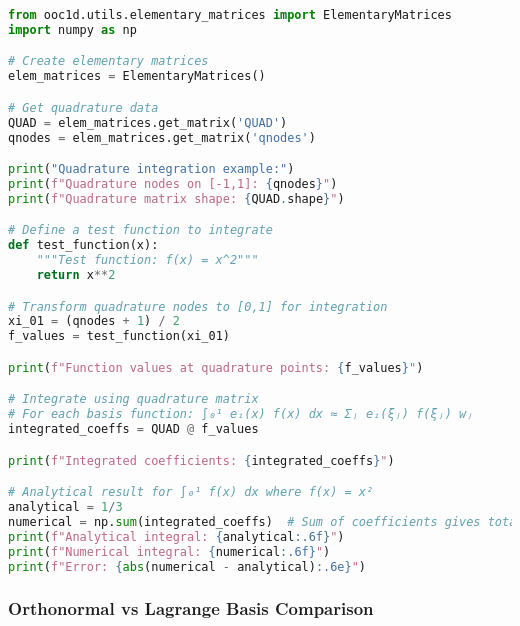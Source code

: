 \begin{lstlisting}[language=Python, caption=Quadrature Integration Example]
from ooc1d.utils.elementary_matrices import ElementaryMatrices
import numpy as np

# Create elementary matrices
elem_matrices = ElementaryMatrices()

# Get quadrature data
QUAD = elem_matrices.get_matrix('QUAD')
qnodes = elem_matrices.get_matrix('qnodes')

print("Quadrature integration example:")
print(f"Quadrature nodes on [-1,1]: {qnodes}")
print(f"Quadrature matrix shape: {QUAD.shape}")

# Define a test function to integrate
def test_function(x):
    """Test function: f(x) = x^2"""
    return x**2

# Transform quadrature nodes to [0,1] for integration
xi_01 = (qnodes + 1) / 2
f_values = test_function(xi_01)

print(f"Function values at quadrature points: {f_values}")

# Integrate using quadrature matrix
# For each basis function: ∫₀¹ eᵢ(x) f(x) dx ≈ Σⱼ eᵢ(ξⱼ) f(ξⱼ) wⱼ
integrated_coeffs = QUAD @ f_values

print(f"Integrated coefficients: {integrated_coeffs}")

# Analytical result for ∫₀¹ f(x) dx where f(x) = x²
analytical = 1/3
numerical = np.sum(integrated_coeffs)  # Sum of coefficients gives total integral
print(f"Analytical integral: {analytical:.6f}")
print(f"Numerical integral: {numerical:.6f}")
print(f"Error: {abs(numerical - analytical):.6e}")
\end{lstlisting}

\subsubsection{Orthonormal vs Lagrange Basis Comparison}

